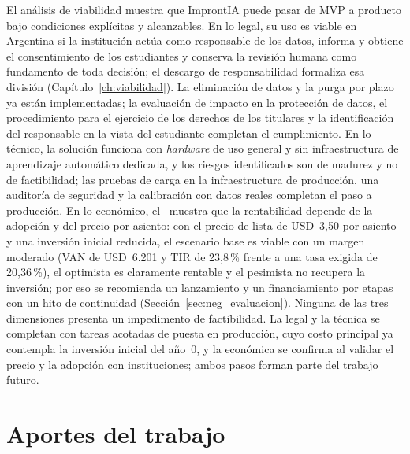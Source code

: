 El análisis de viabilidad muestra que ImprontIA puede pasar de MVP a producto bajo condiciones explícitas y alcanzables. En lo legal, su uso es viable en Argentina si la institución actúa como responsable de los datos, informa y obtiene el consentimiento de los estudiantes y conserva la revisión humana como fundamento de toda decisión; el descargo de responsabilidad formaliza esa división (Capítulo~\ref{ch:viabilidad}). La eliminación de datos y la purga por plazo ya están implementadas; la evaluación de impacto en la protección de datos, el procedimiento para el ejercicio de los derechos de los titulares y la identificación del responsable en la vista del estudiante completan el cumplimiento. En lo técnico, la solución funciona con \textit{hardware} de uso general y sin infraestructura de aprendizaje automático dedicada, y los riesgos identificados son de madurez y no de factibilidad; las pruebas de carga en la infraestructura de producción, una auditoría de seguridad y la calibración con datos reales completan el paso a producción. En lo económico, el \ muestra que la rentabilidad depende de la adopción y del precio por asiento: con el precio de lista de USD~3,50 por asiento y una inversión inicial reducida, el escenario base es viable con un margen moderado (VAN de USD~6.201 y TIR de 23,8\,\% frente a una tasa exigida de 20,36\,\%), el optimista es claramente rentable y el pesimista no recupera la inversión; por eso se recomienda un lanzamiento y un financiamiento por etapas con un hito de continuidad (Sección~\ref{sec:neg_evaluacion}). Ninguna de las tres dimensiones presenta un impedimento de factibilidad. La legal y la técnica se completan con tareas acotadas de puesta en producción, cuyo costo principal ya contempla la inversión inicial del año~0, y la económica se confirma al validar el precio y la adopción con instituciones; ambos pasos forman parte del trabajo futuro.

\section{Aportes del trabajo}
\label{sec:concl_aportes}

